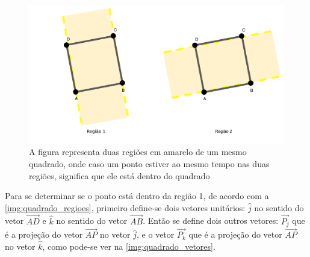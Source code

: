 \begin{alineas}[leftmargin=0pt, itemindent=20pt, labelwidth=15pt, labelsep=5pt, listparindent=1.25cm, align=left]
    \begin{figure}[!htb]
        \caption{\label{img:quadrado_regioes} A figura representa duas regiões em amarelo de um mesmo quadrado, onde caso um ponto estiver ao mesmo tempo nas duas regiões, significa que ele está dentro do quadrado}
    	\begin{center}
            \includegraphics[scale=0.5]{img/quadrado_regioes.png}
    	\end{center}
    \end{figure}
    
    Para se determinar se o ponto está dentro da região 1, de acordo com a \autoref{img:quadrado_regioes}, primeiro define-se dois vetores unitários: $\hat{j}$ no sentido do vetor $\overrightarrow{AD}$ e $\hat{k}$ no sentido do vetor $\overrightarrow{AB}$. Então se define dois outros vetores: $\overrightarrow{P_j}$ que é a projeção do vetor $\overrightarrow{AP}$ no vetor $\hat{j}$, e o vetor $\overrightarrow{P_k}$ que é a projeção do vetor $\overrightarrow{AP}$ no vetor $\hat{k}$, como pode-se ver na \autoref{img:quadrado_vetores}.
     

\end{alineas}
